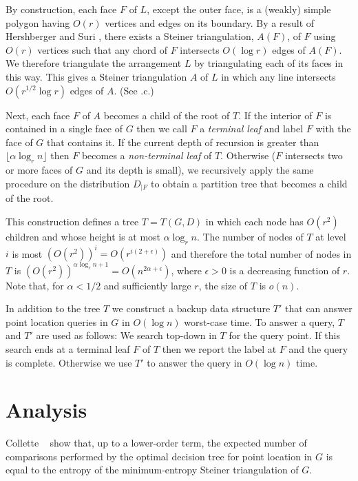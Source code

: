 \documentclass{patmorin}
\begin{document}
By construction, each face $F$ of $L$, except the outer face, is a
(weakly) simple polygon having $O(r)$ vertices and edges on its boundary.
By a result of Hershberger and Suri \cite{hs95}, there exists a Steiner
triangulation, $A(F)$, of $F$ using $O(r)$ vertices such that any chord
of $F$ intersects $O(\log r)$ edges of $A(F)$. We therefore triangulate
the arrangement $L$ by triangulating each of its faces in this way.
This gives a Steiner triangulation $A$ of $L$ in which any line intersects
$O(r^{1/2}\log r)$ edges of $A$.
(See .c.)


Next, each face $F$ of $A$ becomes a child of the root of $T$.  If the
interior of $F$ is contained in a single face of $G$ then we call $F$ a
\emph{terminal leaf} and label $F$ with the face of $G$ that contains it.
If the current depth of recursion is greater than $\lfloor\alpha \log_{r}
n\rfloor$ then $F$ becomes a \emph{non-terminal leaf} of $T$.  Otherwise
($F$ intersects two or more faces of $G$ and its depth is small),
we recursively apply the same procedure on the distribution $D_{|F}$
to obtain a partition tree that becomes a child of the root.

This construction defines a tree $T=T(G,D)$ in which
each node has $O(r^2)$ children and whose height is at most
$\alpha\log_{r} n$.  The number of nodes of $T$ at level $i$ is most
$(O(r^2))^i=O(r^{i(2+\epsilon)})$ and therefore the total number of nodes
in $T$ is $(O(r^2))^{\alpha \log_{r} n+1} = O(n^{2\alpha+\epsilon})$, where
$\epsilon>0$ is a decreasing function of $r$.  Note that, for $\alpha <
1/2$ and sufficiently large $r$, the size of $T$ is $o(n)$.

In addition to the tree $T$ we construct a backup data structure $T'$ that
can answer point location queries in $G$ in $O(\log n)$ worst-case time.
To answer a query, $T$ and $T'$ are used as follows:  We search top-down
in $T$ for the query point. If this search ends at a terminal leaf
$F$ of $T$ then we report the label at $F$ and the query is complete.
Otherwise we use $T'$ to answer the query in $O(\log n)$ time.

\section{Analysis}

Collette \etal\ \cite{cdilm08,cdilm09} show that, up to a lower-order
term, the expected number of comparisons performed by the optimal
decision tree for point location in $G$ is equal to the entropy of the
minimum-entropy Steiner triangulation of $G$.
\end{document}
